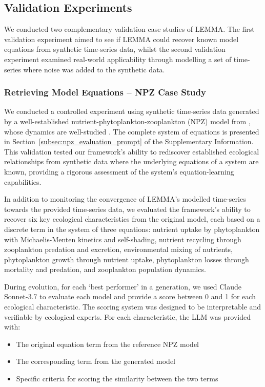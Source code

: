 \subsection{Validation Experiments}

We conducted two complementary validation case studies of LEMMA. The first validation experiment aimed to see if LEMMA could recover known model equations from synthetic time-series data, whilst the second validation experiment examined real-world applicability through modelling a set of time-series where noise was added to the synthetic data.

\subsubsection{Retrieving Model Equations -- NPZ Case Study}

We conducted a controlled experiment using synthetic time-series data generated by a well-established nutrient-phytoplankton-zooplankton (NPZ) model from \cite{edwards1999zooplankton}, whose dynamics are well-studied \citep{boschetti2008mapping,boschetti2010detecting}. The complete system of equations is presented in Section~\ref{subsec:npz_evaluation_prompt} of the Supplementary Information. This validation tested our framework's ability to rediscover established ecological relationships from synthetic data where the underlying equations of a system are known, providing a rigorous assessment of the system's equation-learning capabilities.

In addition to monitoring the convergence of LEMMA's modelled time-series towards the provided time-series data, we evaluated the framework's ability to recover six key ecological characteristics from the original model, each based on a discrete term in the system of three equations: nutrient uptake by phytoplankton with Michaelis-Menten kinetics and self-shading, nutrient recycling through zooplankton predation and excretion, environmental mixing of nutrients, phytoplankton growth through nutrient uptake, phytoplankton losses through mortality and predation, and zooplankton population dynamics.

During evolution, for each `best performer' in a generation, we used Claude Sonnet-3.7 to evaluate each model and provide a score between 0 and 1 for each ecological characteristic. The scoring system was designed to be interpretable and verifiable by ecological experts. For each characteristic, the LLM was provided with:

\begin{itemize}
    \item The original equation term from the reference NPZ model
    \item The corresponding term from the generated model
    \item Specific criteria for scoring the similarity between the two terms
\end{itemize}

